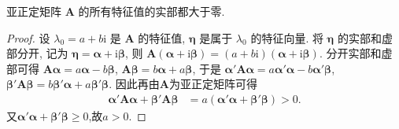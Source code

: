 \documentclass[../../main.tex]{subfiles}%
\begin{document}
\begin{proposition}\label{proposition:亚正定矩阵的所有特征值的实部都大于零}
亚正定矩阵 \(\boldsymbol{A}\) 的所有特征值的实部都大于零.
\end{proposition}
\begin{proof}

设 \(\lambda_0 = a + b\mathrm{i}\) 是 \(\boldsymbol{A}\) 的特征值, \(\boldsymbol{\eta}\) 是属于 \(\lambda_0\) 的特征向量. 将 \(\boldsymbol{\eta}\) 的实部和虚部分开, 记为 \(\boldsymbol{\eta}=\boldsymbol{\alpha}+\mathrm{i}\boldsymbol{\beta}\), 则 \(\boldsymbol{A}(\boldsymbol{\alpha}+\mathrm{i}\boldsymbol{\beta})=(a + b\mathrm{i})(\boldsymbol{\alpha}+\mathrm{i}\boldsymbol{\beta})\). 分开实部和虚部可得 \(\boldsymbol{A}\boldsymbol{\alpha}=a\boldsymbol{\alpha}-b\boldsymbol{\beta}\), \(\boldsymbol{A}\boldsymbol{\beta}=b\boldsymbol{\alpha}+a\boldsymbol{\beta}\), 于是 \(\boldsymbol{\alpha}'\boldsymbol{A}\boldsymbol{\alpha}=a\boldsymbol{\alpha}'\boldsymbol{\alpha}-b\boldsymbol{\alpha}'\boldsymbol{\beta}\), \(\boldsymbol{\beta}'\boldsymbol{A}\boldsymbol{\beta}=b\boldsymbol{\beta}'\boldsymbol{\alpha}+a\boldsymbol{\beta}'\boldsymbol{\beta}\). 因此再由$\boldsymbol{A}$为亚正定矩阵可得
\begin{align*}
\boldsymbol{\alpha}'\boldsymbol{A}\boldsymbol{\alpha}+\boldsymbol{\beta}'\boldsymbol{A}\boldsymbol{\beta}&=a(\boldsymbol{\alpha}'\boldsymbol{\alpha}+\boldsymbol{\beta}'\boldsymbol{\beta})>0.
\end{align*} 
又$\boldsymbol{\alpha}'\boldsymbol{\alpha}+\boldsymbol{\beta}'\boldsymbol{\beta}\geqslant 0$,故$a>0.$

\end{proof}
\end{document}
